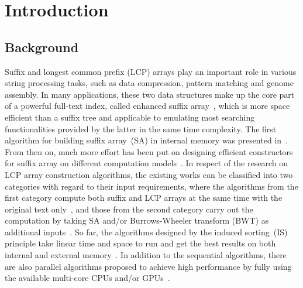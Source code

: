 \documentclass[10pt,journal,compsoc]{IEEEtran}
\begin{document}
\IEEEdisplaynontitleabstractindextext

\IEEEpeerreviewmaketitle

\section{Introduction}\label{sec:introduction}

\subsection{Background} \label{sec:introduction:background}

Suffix and longest common prefix (LCP) arrays play an important role in various string processing tasks, such as data compression, pattern matching and genome assembly. In many applications, these two data structures make up the core part of a powerful full-text index, called enhanced suffix array~\cite{Abouelhodaa2004}, which is more space efficient than a suffix tree and applicable to emulating most searching functionalities provided by the latter in the same time complexity. The first algorithm for building suffix array~(SA) in internal memory was presented in~\cite{Manber1993}. From then on, much more effort has been put on designing efficient constructors for suffix array on different computation models~\cite{Karkkainen2003, Ko2003, Kim2003, Nong11, Dementiev2008, Ferragina2012, Manzini2004, Bingmann12, Karkkainen2014, Nong14, Nong15}. In respect of the research on LCP array construction algorithms, the existing works can be classified into two categories with regard to their input requirements, where the algorithms from the first category compute both suffix and LCP arrays at the same time with the original text only~\cite{Fischer11, Bingmann12, Flick2015}, and those from the second category carry out the computation by taking SA and/or Burrows-Wheeler transform (BWT) as additional inputs~\cite{Kasai2001,Karkkainen2009, Fischer11, Puglisi2008, Deo2013}. So far, the algorithms designed by the induced sorting~(IS) principle take linear time and space to run and get the best results on both internal and external memory~\cite{Nong11, Bingmann12}. In addition to the sequential algorithms, there are also parallel algorithms proposed to achieve high performance by fully using the available multi-core CPUs and/or GPUs~\cite{Osipov2012, Deo2013, Wang2015, Karkkainen2015, Karkkainen2016}.
\end{document}
